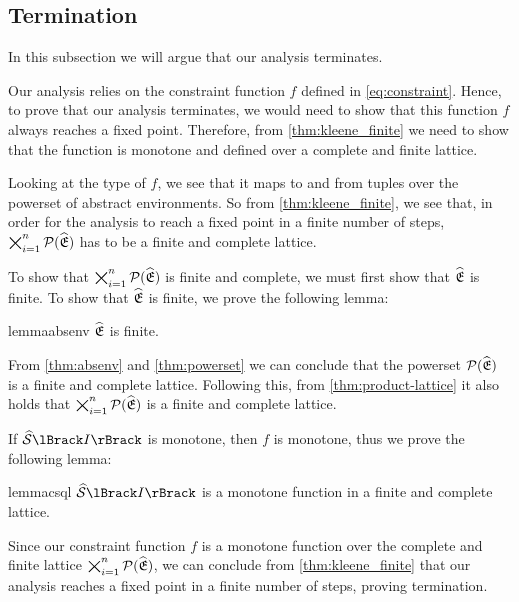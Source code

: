\subsection{Termination}\label{subsec:termination}
In this subsection we will argue that our analysis terminates.

Our analysis relies on the constraint function $f$ defined in \autoref{eq:constraint}.
Hence, to prove that our analysis terminates, we would need to show that this function $f$ always reaches a fixed point.
Therefore, from \autoref{thm:kleene_finite} we need to show that the function is monotone and defined over a complete and finite lattice.

Looking at the type of $f$, we see that it maps to and from tuples over the powerset of abstract environments.
So from \autoref{thm:kleene_finite}, we see that, in order for the analysis to reach a fixed point in a finite number of steps, $\bigtimes_{i = 1}^n \mathcal{P}(\widehat{\mathfrak{E}})$ has to be a finite and complete lattice.

To show that $\bigtimes_{i = 1}^n \mathcal{P}(\widehat{\mathfrak{E}})$ is finite and complete, we must first show that $\widehat{\mathfrak{E}}$ is finite.
To show that $\widehat{\mathfrak{E}}$ is finite, we prove the following lemma:

\begin{restatable}{lemma}{absenv}\label{thm:absenv}
$\widehat{\mathfrak{E}}$ is finite.
\end{restatable}

From \autoref{thm:absenv} and \autoref{thm:powerset} we can conclude that the powerset $\mathcal{P}(\widehat{\mathfrak{E}})$ is a finite and complete lattice.
Following this, from \autoref{thm:product-lattice} it also holds that $\bigtimes_{i = 1}^n \mathcal{P}(\widehat{\mathfrak{E}})$ is a finite and complete lattice.

If $\abssem{I}$ is monotone, then $f$ is monotone, thus we prove the following lemma:
\begin{restatable}{lemma}{csql}\label{thm:csql}
    $\abssem{I}$ is a monotone function in a finite and complete lattice.
\end{restatable}

Since our constraint function $f$ is a monotone function over the complete and finite lattice $\bigtimes_{i = 1}^n \mathcal{P}(\widehat{\mathfrak{E}})$, we can conclude from \autoref{thm:kleene_finite} that our analysis reaches a fixed point in a finite number of steps, proving termination.
